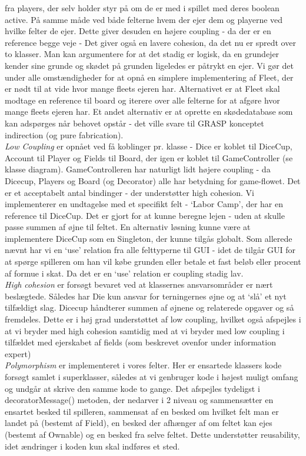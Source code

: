 fra players, der selv holder styr på om de er med i spillet med deres boolean
active. På samme måde ved både felterne hvem der ejer dem og playerne ved hvilke
felter de ejer. Dette giver desuden en højere coupling - da der er en reference
begge veje - Det giver også en lavere cohesion, da det nu er spredt over to
klasser. Man kan argumentere for at det stadig er logisk, da en grundejer kender
sine grunde og skødet på grunden ligeledes er påtrykt en ejer. Vi gør det under
alle omstændigheder for at opnå en simplere implementering af Fleet, der er nødt
til at vide hvor mange fleets ejeren har. Alternativet er at Fleet skal modtage
en reference til board og iterere over alle felterne for at afgøre hvor mange
fleets ejeren har. Et andet alternativ er at oprette en skødedatabase som kan
adspørges når behovet opstår - det ville svare til GRASP konceptet indirection
(og pure fabrication).\\
\indent \emph{Low Coupling} er opnået ved få koblinger pr. klasse - Dice er
koblet til DiceCup, Account til Player og Fields til Board, der igen er koblet
til GameController (se klasse diagram). GameControlleren har naturligt lidt
højere coupling - da  Dicecup, Players og Board (og Decorator) alle har
betydning for game-flowet. Det  er et acceptabelt antal bindinger - der
understøtter high cohesion. Vi  implementerer en undtagelse med et specifikt
felt - ‘Labor Camp’, der har en  reference til DiceCup. Det er gjort for at
kunne beregne lejen - uden at skulle  passe summen af øjne til feltet. En
alternativ løsning kunne være at  implementere DiceCup som en Singleton, der
kunne tilgås globalt. Som allerede  nævnt har vi en ‘use’ relation fra alle
felttyperne til GUI - idet de tilgår GUI  for at spørge spilleren om han vil
købe grunden eller betale et fast beløb eller  procent af formue i skat. Da det
er en ‘use’ relation er coupling stadig lav.\\
\indent \emph{High cohesion} er forsøgt bevaret ved at klassernes ansvarsområder
er nært beslægtede. Således har Die kun ansvar for terningernes øjne og at ‘slå’ et nyt
tilfældigt slag. Dicecup håndterer summen af øjnene og relaterede opgaver og så
fremdeles. Dette er i høj grad understøttet af low coupling, hvilket også
afspejles i at vi bryder med high cohesion samtidig med at vi bryder med low
coupling i tilfældet med ejerskabet af fields (som beskrevet ovenfor under
information expert)\\
\indent \emph{Polymorphism} er implementeret i vores felter. Her er
ensartede klassers kode forsøgt samlet i superklasser, således at vi genbruger
kode i højest muligt omfang og undgår at skrive den samme kode to gange. Det
afspejles tydeligst i decoratorMessage() metoden, der nedarver i 2 niveau og
sammensætter en ensartet besked til spilleren, sammensat af en besked om hvilket
felt man er landet på (bestemt af Field), en besked der afhænger af om feltet
kan ejes (bestemt af Ownable) og en besked fra selve feltet. Dette understøtter
reusability, idet ændringer i koden kun skal indføres et sted.